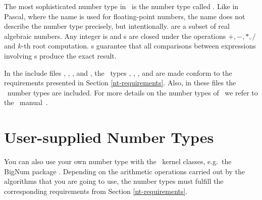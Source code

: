 The most sophisticated number type in \leda\ is the number type called
. Like in Pascal, where the name  is used for
floating-point numbers, the name  does not describe the
number type precisely, but intentionally.  
 are a subset of real algebraic
numbers.  Any integer is  and s are closed under
the operations $+,-,*,/$ and $k$-th root computation. 
s guarantee that
all comparisons between expressions involving s produce the
exact result.

In the include files , , 
, and , 
the \leda\ types , ,
, 
and  are made conform to the requirements presented in
Section \ref{nt-requirements}. 
Also, in these files the \leda\ number types are included.
For more details on the number types of \leda\ we refer to the \leda\ 
manual~\cite{mnsu-lum}.




\section{User-supplied Number Types}

You can also use your own number type with the \cgal\ kernel
classes, e.g.\  the {\sc BigNum} package \cite{svh-bpepa-89}.
Depending on the arithmetic operations carried out by the algorithms
that you are going to use, the number types must fulfill the
corresponding requirements from Section \ref{nt-requirements}. 


